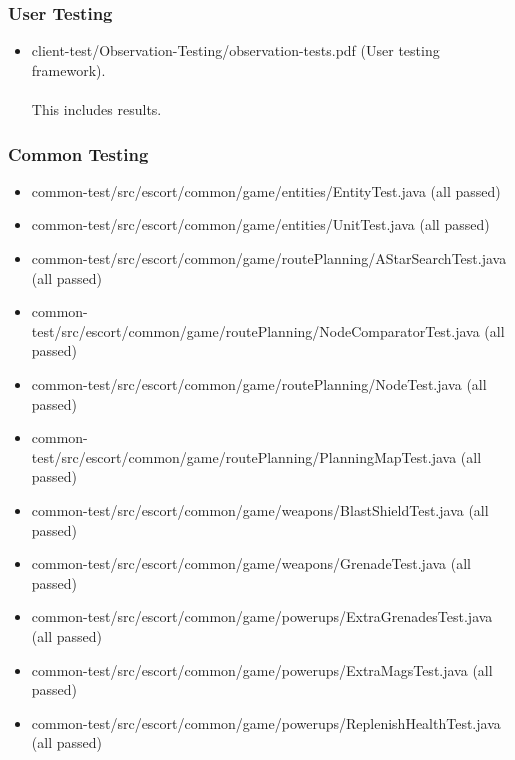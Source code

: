 \documentclass[12pt]{article}
\newcommand{\return}{\\\\\noindent}
\begin{document}
\subsubsection{User Testing}
\begin{itemize}
\item client-test/Observation-Testing/observation-tests.pdf (User testing framework).\return This includes results.
\end{itemize}
\subsubsection{Common Testing}
\begin{itemize}
\item common-test/src/escort/common/game/entities/EntityTest.java (all passed)
\item common-test/src/escort/common/game/entities/UnitTest.java (all passed)
\item common-test/src/escort/common/game/routePlanning/AStarSearchTest.java (all passed)
\item common-test/src/escort/common/game/routePlanning/NodeComparatorTest.java (all passed)
\item common-test/src/escort/common/game/routePlanning/NodeTest.java (all passed)
\item common-test/src/escort/common/game/routePlanning/PlanningMapTest.java (all passed)
\item common-test/src/escort/common/game/weapons/BlastShieldTest.java (all passed)
\item common-test/src/escort/common/game/weapons/GrenadeTest.java (all passed)
\item common-test/src/escort/common/game/powerups/ExtraGrenadesTest.java (all passed)
\item common-test/src/escort/common/game/powerups/ExtraMagsTest.java (all passed)
\item common-test/src/escort/common/game/powerups/ReplenishHealthTest.java (all passed)
\end{itemize}
\end{document}
